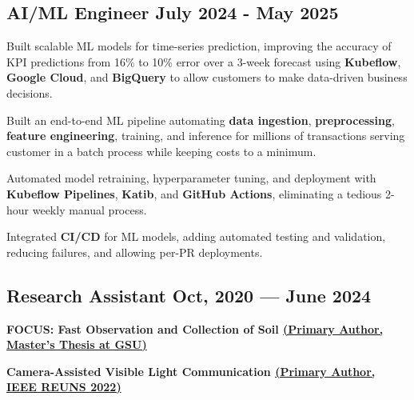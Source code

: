 \subsection{{AI/ML Engineer \hfill July 2024 - May 2025}}  

\begin{zitemize}
\item Built scalable ML models for time-series prediction, improving the accuracy of KPI predictions from 16\% to 10\% error over a 3-week forecast using \textbf{Kubeflow}, \textbf{Google Cloud}, and \textbf{BigQuery} to allow customers to make data-driven business decisions.  
\item Built an end-to-end ML pipeline automating \textbf{data ingestion}, \textbf{preprocessing}, \textbf{feature engineering}, training, and inference for millions of transactions serving customer in a batch process while keeping costs to a minimum.
\item Automated model retraining, hyperparameter tuning, and deployment with \textbf{Kubeflow Pipelines}, \textbf{Katib}, and \textbf{GitHub Actions}, eliminating a tedious 2-hour weekly manual process.  
\item Integrated \textbf{CI/CD} for ML models, adding automated testing and validation, reducing failures, and allowing per-PR deployments.  

\end{zitemize}  



\subsection{{Research Assistant \hfill Oct, 2020 --- June 2024}}
\begin{zitemize}
\item \textbf{FOCUS: Fast Observation and Collection of Soil \href{https://scholarworks.gsu.edu/cs_theses/115/}{(Primary Author, Master’s Thesis at GSU)}}
\item \textbf{Camera-Assisted Visible Light Communication \href{https://ieeexplore.ieee.org/abstract/document/9973607}{(Primary Author, IEEE REUNS 2022)}}
\end{zitemize}



